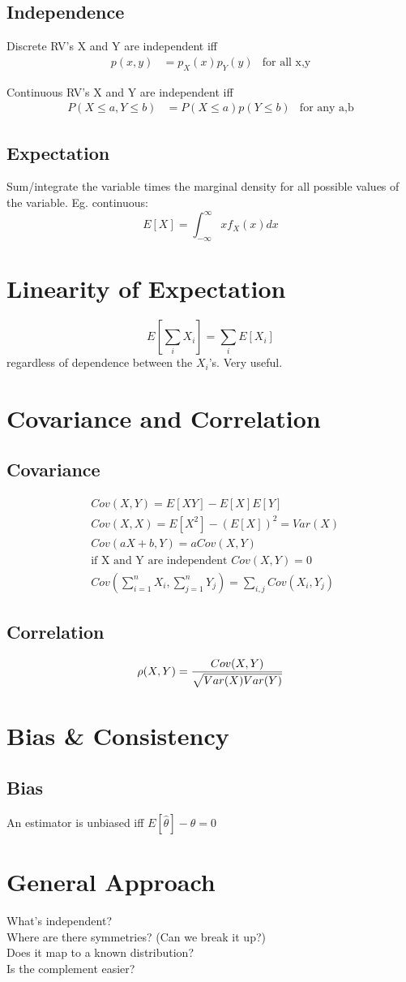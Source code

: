 \documentclass[12pt]{amsart}
\begin{document}
\subsection{Independence}
Discrete RV's X and Y are independent iff
\begin{align*}
p(x,y) &= p_X(x)p_Y(y) & \text{for all x,y}
\end{align*}

Continuous RV's X and Y are independent iff
\begin{align*}
P(X \leq a, Y \leq b) &= P(X\leq a)p(Y \leq b) & \text{for any a,b}
\end{align*}

\subsection{Expectation}
Sum/integrate the variable times the marginal density for all possible values of the variable. Eg. continuous:
\[
E[X] = \int_{-\infty}^{\infty} xf_X(x) dx
\]
\section{Linearity of Expectation}
\[
E\left[\sum_i X_i\right] = \sum_i E[X_i]
\]
regardless of dependence between the $X_i$'s. Very useful.
\section{Covariance and Correlation}
\subsection{Covariance}
\begin{align*}
&Cov(X,Y) = E[XY] - E[X]E[Y] \\
&Cov(X,X) = E[X^2] - (E[X])^2 = Var(X) \\
&Cov(aX+b, Y) = a Cov(X,Y)\\
&\text{if X and Y are independent } Cov(X,Y)=0 \\
&Cov \left(\sum_{i=1}^n X_i, \sum_{j=1}^n Y_j\right) = \sum_{i,j} Cov(X_i, Y_j)
\end{align*}
%
\subsection{Correlation}
\[
\rho(X,Y) = {Cov(X,Y) \over \sqrt{Var(X) Var(Y)}}
\]
%
\section{Bias \& Consistency}
\subsection{Bias}
An estimator is unbiased iff $E[\hat{\theta}] - \theta = 0$
\section{General Approach}
What's independent?\\
Where are there symmetries? (Can we break it up?)\\
Does it map to a known distribution?\\
Is the complement easier?\\
\end{document}
